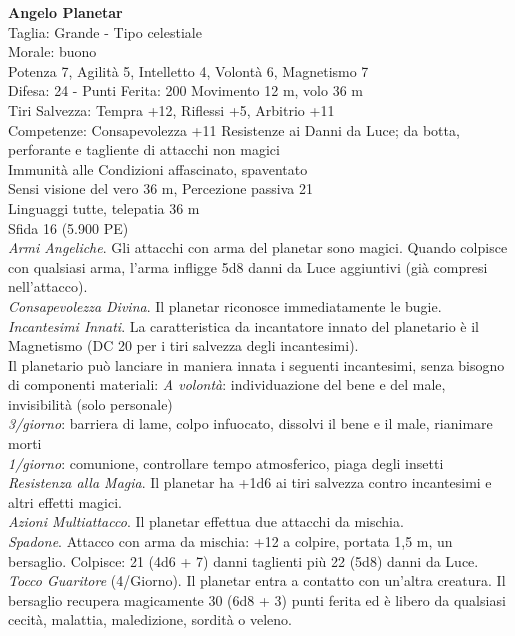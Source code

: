 \begin{multicols}{2}
\medskip\textbf{Angelo Planetar}\\
Taglia: Grande  - \hspace*{0pt}\hfill{Tipo celestiale}\\
Morale: buono\\
Potenza 7, Agilità 5, Intelletto 4, Volontà 6, Magnetismo 7\\
Difesa: 24 - \hspace*{0pt}\hfill{Punti Ferita: 200}
Movimento 12 m, volo 36 m\\
Tiri Salvezza: Tempra +12, Riflessi +5, Arbitrio +11\\
Competenze: Consapevolezza +11
Resistenze ai Danni da Luce; da botta, perforante e tagliente di attacchi non magici\\
Immunità alle Condizioni affascinato, spaventato\\
Sensi visione del vero 36 m, Percezione passiva 21\\
Linguaggi tutte, telepatia 36 m\\
Sfida 16 (5.900 PE)\\
\textit{Armi Angeliche}. Gli attacchi con arma del planetar sono magici. Quando colpisce con qualsiasi arma, l’arma infligge 5d8 danni da Luce aggiuntivi (già compresi nell’attacco).\\
\textit{Consapevolezza Divina}. Il planetar riconosce immediatamente le bugie.\\
\textit{Incantesimi Innati}. La caratteristica da incantatore innato del planetario è il Magnetismo (DC 20 per i tiri salvezza degli incantesimi).\\
Il planetario può lanciare in maniera innata i seguenti incantesimi, senza bisogno di componenti materiali: 
\textit{A volontà}: individuazione del bene e del male, invisibilità (solo personale)\\
\textit{3/giorno}: barriera di lame, colpo infuocato, dissolvi il bene e il male, rianimare morti\\
\textit{1/giorno}: comunione, controllare tempo atmosferico, piaga degli insetti\\
\textit{Resistenza alla Magia}. Il planetar ha +1d6 ai tiri salvezza contro incantesimi e altri effetti magici.\\
\textit{Azioni Multiattacco}. Il planetar effettua due attacchi da mischia.\\
\textit{Spadone}. Attacco con arma da mischia: +12 a colpire, portata 1,5 m, un bersaglio.
Colpisce: 21 (4d6 + 7) danni taglienti più 22 (5d8) danni da Luce.\\
\textit{Tocco Guaritore} (4/Giorno). Il planetar entra a contatto con un’altra creatura. Il bersaglio recupera magicamente 30 (6d8 + 3) punti ferita ed è libero da qualsiasi cecità, malattia, maledizione, sordità o veleno.\\


\end{multicols}
